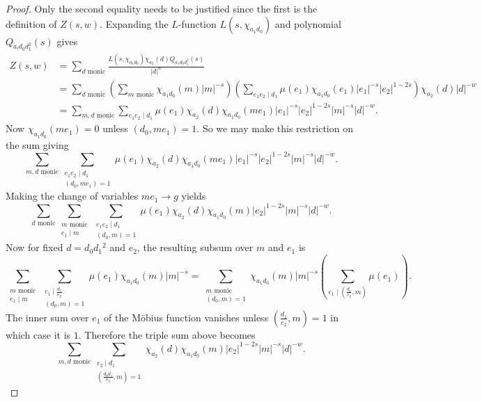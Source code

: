 \documentclass[12pt,reqno,oneside]{amsart}
\begin{document}
    \begin{proof}
        Only the second equality needs to be justified since the first is the definition of $Z(s,w)$. Expanding the $L$-function $L(s,\chi_{a_{1}d_{0}})$ and polynomial $Q_{a_{!}d_{0}d_{1}^{2}}(s)$ gives
        \begin{align*}
            Z(s,w) &= \sum_{\text{$d$ monic}}\frac{L(s,\chi_{a_{1}d_{0}})\chi_{a_{2}}(d)Q_{a_{1}d_{0}d_{1}^{2}}(s)}{|d|^{w}} \\
            &= \sum_{\text{$d$ monic}}\left(\sum_{\text{$m$ monic}}\chi_{a_{1}d_{0}}(m)|m|^{-s}\right)\left(\sum_{e_{1}e_{2} \mid d_{1}}\mu(e_{1})\chi_{a_{1}d_{0}}(e_{1})|e_{1}|^{-s}|e_{2}|^{1-2s}\right)\chi_{a_{2}}(d)|d|^{-w} \\
            &= \sum_{\text{$m,d$ monic}}\sum_{e_{1}e_{2} \mid d_{1}}\mu(e_{1})\chi_{a_{2}}(d)\chi_{a_{1}d_{0}}(me_{1})|e_{1}|^{-s}|e_{2}|^{1-2s}|m|^{-s}|d|^{-w}.
        \end{align*}
        Now $\chi_{a_{1}d_{0}}(me_{1}) = 0$ unless $(d_{0},me_{1}) = 1$. So we may make this restriction on the sum giving
        \[
            \sum_{\text{$m,d$ monic}}\sum_{\substack{e_{1}e_{2} \mid d_{1} \\ (d_{0},me_{1}) = 1}}\mu(e_{1})\chi_{a_{2}}(d)\chi_{a_{1}d_{0}}(me_{1})|e_{1}|^{-s}|e_{2}|^{1-2s}|m|^{-s}|d|^{-w}.
        \]
        Making the change of variables $me_{1} \to g$ yields
        \[
            \sum_{\text{$d$ monic}}\sum_{\substack{\text{$m$ monic} \\ e_{1} \mid m}}\sum_{\substack{e_{1}e_{2} \mid d_{1} \\ (d_{0},m) = 1}}\mu(e_{1})\chi_{a_{2}}(d)\chi_{a_{1}d_{0}}(m)|e_{2}|^{1-2s}|m|^{-s}|d|^{-w}.
        \]
        Now for fixed $d = d_{0}d_{1}{^{2}}$ and $e_{2}$, the resulting subsum over $m$ and $e_{1}$ is
        \[
            \sum_{\substack{\text{$m$ monic} \\ e_{1} \mid m}}\sum_{\substack{e_{1} \mid \frac{d_{1}}{e_{2}} \\ (d_{0},m) = 1}}\mu(e_{1})\chi_{a_{1}d_{0}}(m)|m|^{-s} = \sum_{\substack{\text{$m$ monic} \\ (d_{0},m) = 1}}\chi_{a_{1}d_{0}}(m)|m|^{-s}\left(\sum_{e_{1} \mid \left(\frac{d_{1}}{e_{2}},m\right)}\mu(e_{1})\right).
        \]
        The inner sum over $e_{1}$ of the M\"obius function vanishes unless $\left(\frac{d_{1}}{e_{2}},m\right) = 1$ in which case it is $1$. Therefore the triple sum above becomes
        \[
            \sum_{\text{$m,d$ monic}}\sum_{\substack{e_{2} \mid d_{1} \\ \left(\frac{d_{0}d_{1}}{e_{2}},m\right) = 1}}\chi_{a_{2}}(d)\chi_{a_{1}d_{0}}(m)|e_{2}|^{1-2s}|m|^{-s}|d|^{-w}.
\]
\end{proof}
\end{document}
